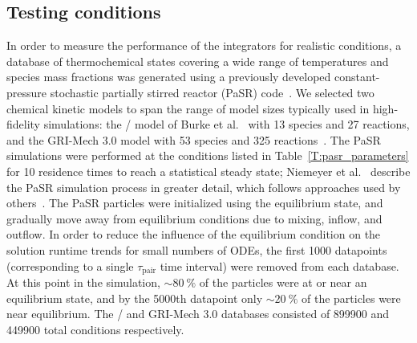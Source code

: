 \documentclass[preprint]{elsarticle}
\begin{document}
\subsection{Testing conditions}
\label{S:pasr_conditions}

In order to measure the performance of the integrators for realistic conditions, a database of thermochemical states covering a wide range of temperatures and species mass fractions was generated using a previously developed constant-pressure stochastic partially stirred reactor (PaSR) code~\cite{Niemeyer:2016aa,niemeyer_2016_51139}.
We selected two chemical kinetic models to span the range of model sizes typically used in high-fidelity simulations: the \slash{} model of Burke et al.~\cite{Burke:2011fh} with 13 species and 27 reactions, and the GRI-Mech 3.0 model with 53 species and 325 reactions~\cite{smith_gri-mech_30}.
The PaSR simulations were performed at the conditions listed in Table~\ref{T:pasr_parameters} for 10 residence times to reach a statistical steady state; Niemeyer et al.~\cite{Niemeyer:2016aa} describe the PaSR simulation process in greater detail, which follows approaches used by others~\cite{Chen:1997ta,Pope:1997wu,Ren:2014cd}.
The PaSR particles were initialized using the equilibrium state, and gradually move away from equilibrium conditions due to mixing, inflow, and outflow.
In order to reduce the influence of the equilibrium condition on the solution runtime trends for small numbers of ODEs, the first \num{1000} datapoints (corresponding to a single $\tau_\text{pair}$ time interval) were removed from each database.
At this point in the simulation, $\sim\SI{80}{\percent}$ of the particles were at or near an equilibrium state, and by the \num{5000}th datapoint only $\sim\SI{20}{\percent}$ of the particles were near equilibrium.
The \slash{} and GRI-Mech 3.0 databases consisted of \num{899900} and \num{449900} total conditions respectively.
\end{document}
